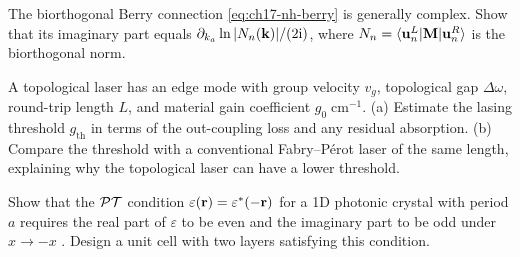 \begin{exercise}
  The biorthogonal Berry connection \eqref{eq:ch17-nh-berry} is
  generally complex.  Show that its imaginary part equals
  $\partial_{k_a}\ln|N_n(\mathbf{k})|/(2\mathrm{i})$, where
  $N_n=\langle\mathbf{u}_n^L|\mathbf{M}|\mathbf{u}_n^R\rangle$ is the
  biorthogonal norm.
\end{exercise}

\begin{exercise}
  A topological laser has an edge mode with group velocity $v_g$,
  topological gap $\Delta\omega$, round-trip length $L$, and material
  gain coefficient $g_0\;\mathrm{cm}^{-1}$.  (a) Estimate the lasing
  threshold $g_{\mathrm{th}}$ in terms of the out-coupling loss and
  any residual absorption.  (b) Compare the threshold with a
  conventional Fabry--P\'erot laser of the same length, explaining why
  the topological laser can have a lower threshold.
\end{exercise}

\begin{exercise}
  Show that the $\mathcal{PT}$ condition $\varepsilon(\mathbf{r})=\varepsilon^*(-\mathbf{r})$
  for a 1D photonic crystal with period $a$ requires the real part of
  $\varepsilon$ to be even and the imaginary part to be odd under
  $x\to-x$ \cite{zhong2021non}.  Design a unit cell with two layers satisfying this
  condition.
\end{exercise}
